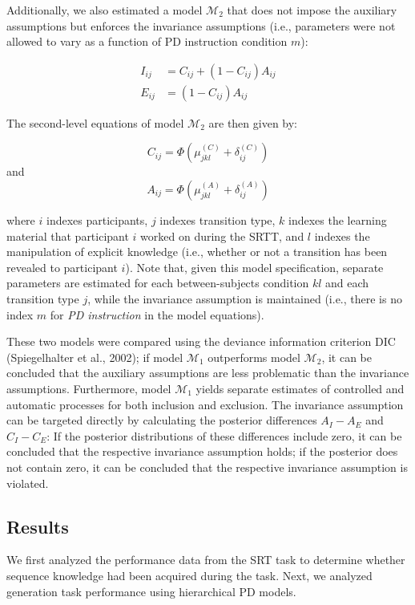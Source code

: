 \documentclass[floatsintext,man]{apa6}
\begin{document}
Additionally, we also estimated a model \(\mathcal{M}_2\) that does not
impose the auxiliary assumptions but enforces the invariance assumptions
(i.e., parameters were not allowed to vary as a function of PD
instruction condition \(m\)):

\[
\begin{aligned}
  I_{ij} & =  C_{ij} + (1-C_{ij}) A_{ij}\\
  E_{ij} & =  (1-C_{ij}) A_{ij}
\end{aligned}
\]

The second-level equations of model \(\mathcal{M}_2\) are then given by:

\[
  C_{ij} = \Phi(\mu_{jkl}^{(C)} + \delta_{ij}^{(C)})
\] and \[
  A_{ij} = \Phi(\mu_{jkl}^{(A)} + \delta_{ij}^{(A)})
\]

where \(i\) indexes participants, \(j\) indexes transition type, \(k\)
indexes the learning material that participant \(i\) worked on during
the SRTT, and \(l\) indexes the manipulation of explicit knowledge
(i.e., whether or not a transition has been revealed to participant
\(i\)). Note that, given this model specification, separate parameters
are estimated for each between-subjects condition \(kl\) and each
transition type \(j\), while the invariance assumption is maintained
(i.e., there is no index \(m\) for \emph{PD instruction} in the model
equations).

These two models were compared using the deviance information criterion
DIC (Spiegelhalter et al., 2002); if model \(\mathcal{M}_1\) outperforms
model \(\mathcal{M}_2\), it can be concluded that the auxiliary
assumptions are less problematic than the invariance assumptions.
Furthermore, model \(\mathcal{M}_1\) yields separate estimates of
controlled and automatic processes for both inclusion and exclusion. The
invariance assumption can be targeted directly by calculating the
posterior differences \(A_{I} - A_{E}\) and \(C_{I} - C_{E}\): If the
posterior distributions of these differences include zero, it can be
concluded that the respective invariance assumption holds; if the
posterior does not contain zero, it can be concluded that the respective
invariance assumption is violated.

\subsection{Results}\label{results}

We first analyzed the performance data from the SRT task to determine
whether sequence knowledge had been acquired during the task. Next, we
analyzed generation task performance using hierarchical PD models.
\end{document}
